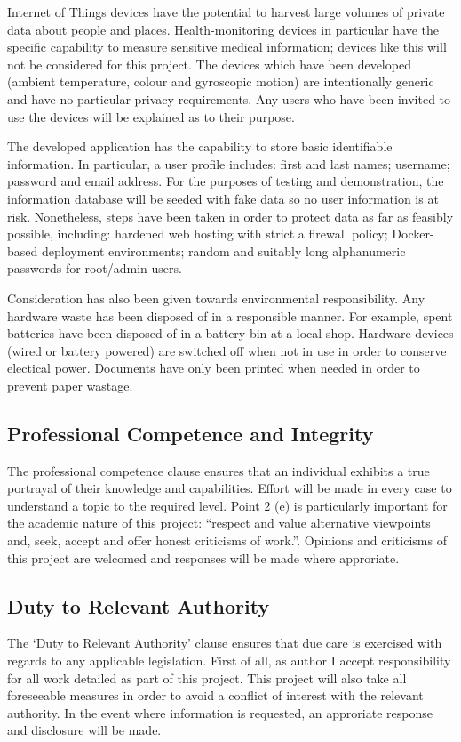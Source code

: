       Internet of Things devices have the potential to harvest large volumes of private data about people and places. Health-monitoring devices in particular have the specific capability to measure sensitive medical information; devices like this will not be considered for this project. The devices which have been developed (ambient temperature, colour and gyroscopic motion) are intentionally generic and have no particular privacy requirements. Any users who have been invited to use the devices will be explained as to their purpose.

      The developed application has the capability to store basic identifiable information. In particular, a user profile includes: first and last names; username; password and email address. For the purposes of testing and demonstration, the information database will be seeded with fake data so no user information is at risk. Nonetheless, steps have been taken in order to protect data as far as feasibly possible, including: hardened web hosting with strict a firewall policy; Docker-based deployment environments; random and suitably long alphanumeric passwords for root/admin users.

      Consideration has also been given towards environmental responsibility. Any hardware waste has been disposed of in a responsible manner. For example, spent batteries have been disposed of in a battery bin at a local shop. Hardware devices (wired or battery powered) are switched off when not in use in order to conserve electical power. Documents have only been printed when needed in order to prevent paper wastage. 

    \subsection{Professional Competence and Integrity}
      The professional competence clause ensures that an individual exhibits a true portrayal of their knowledge and capabilities. Effort will be made in every case to understand a topic to the required level. Point 2 (e) is particularly important for the academic nature of this project: ``respect and value alternative viewpoints and, seek, accept and offer honest criticisms of work.''. Opinions and criticisms of this project are welcomed and responses will be made where approriate. 

    \subsection{Duty to Relevant Authority}
      The `Duty to Relevant Authority' clause ensures that due care is exercised with regards to any applicable legislation. First of all, as author I accept responsibility for all work detailed as part of this project. This project will also take all foreseeable measures in order to avoid a conflict of interest with the relevant authority. In the event where information is requested, an approriate response and disclosure will be made.

